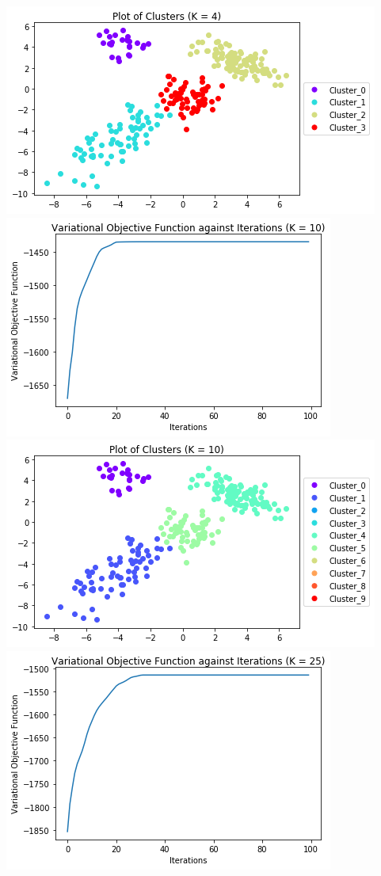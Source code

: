 \documentclass[twoside]{homework}
\begin{document}
\begin{centering}
\includegraphics{VI_Plot_2}\\
\newpage
\includegraphics{VI_3}\\
\includegraphics{VI_Plot_3}\\
\newpage
\includegraphics{VI_4}\\

\end{centering}
\end{document}
